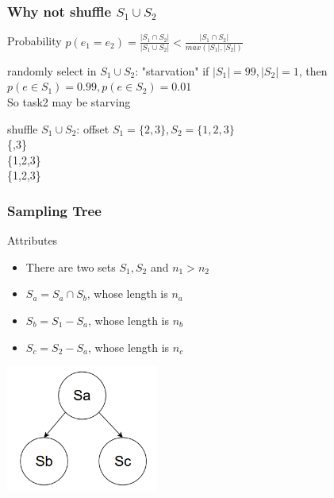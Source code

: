 \documentclass[notheorems, aspectratio=54]{beamer}
\begin{document}
\begin{frame}
    \frametitle{Why not shuffle $S_1 \cup S_2$}
    \begin{block} {Probability}
        $p(e_1=e_2) = \frac{|S_1\cap S_2|}{|S_1 \cup S_2|} < \frac{|S_1\cap S_2|}{max(|S_1|,|S_2|)}$
    \end{block}
    \begin{block} {randomly select in $S_1\cup S_2$: "starvation"}
        if $|S_1| = 99, |S_2| = 1$,
        then $p(e \in S_1) = 0.99, p(e \in S_2) = 0.01$ \\
        So task2 may be starving
    \end{block}
    \begin{block} {shuffle $S_1\cup S_2$: offset}
        $S_1 = \{2,3\}, S_2 = \{1,2,3\}$\\
        \{\space {},3\}\\
        \{1,2,3\} \\
        \{1,2,3\}\\
    \end{block}
\end{frame}

\begin{frame}
    \frametitle{Sampling Tree}
    \begin{block} {Attributes}
        \begin{itemize}
            \item There are two sets $S_1, S_2$ and $n_1 > n_2$
            \item $S_a = S_a\cap S_b$, whose length is $n_a$
            \item $S_b = S_1- S_a$, whose length is $n_b$
            \item $S_c = S_2- S_a$, whose length is $n_c$
        \end{itemize}
    \end{block}
    \centering
    \includegraphics[width=5cm]{global_img_dir/SamplingTree1.png}
\end{frame}
\end{document}
